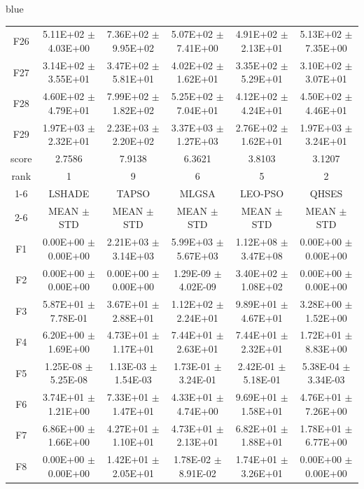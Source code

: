 \documentclass[journal, onecolumn]{IEEEtran}
\begin{document}
\begin{color}{blue}
\begin{table}[htbp!]
\begin{tabular}{c|ccccc}
		F26	 &	5.11E+02	$\pm$	4.03E+00	 &	7.36E+02	$\pm$	9.95E+02		 &	5.07E+02	$\pm$	7.41E+00		 &	4.91E+02	$\pm$	2.13E+01		 &	5.13E+02	$\pm$	7.35E+00	\\	
		F27	 &	3.14E+02	$\pm$	3.55E+01	 &	3.47E+02	$\pm$	5.81E+01		 &	4.02E+02	$\pm$	1.62E+01		 &	3.35E+02	$\pm$	5.29E+01		 &	3.10E+02	$\pm$	3.07E+01	\\	
		F28	 &	4.60E+02	$\pm$	4.79E+01	 &	7.99E+02	$\pm$	1.82E+02		 &	5.25E+02	$\pm$	7.04E+01		 &	4.12E+02	$\pm$	4.24E+01		 &	4.50E+02	$\pm$	4.46E+01	\\	
		F29	 &	1.97E+03	$\pm$	2.32E+01	 &	2.23E+03	$\pm$	2.20E+02		 &	3.37E+03	$\pm$	1.27E+03		 &	2.76E+02	$\pm$	1.62E+01		 &	1.97E+03	$\pm$	3.24E+01	\\	\hline
		score		& 2.7586 & 7.9138 & 6.3621 & 3.8103 & 3.1207											\\												
		rank	 	 & 1 & 9 & 6 & 5 & 2 											\\	\cline{1-6}											
		&	LSHADE				 &	TAPSO				 &	MLGSA				 &	LEO-PSO				 &	QHSES			\\\cline{2-6}	
		&	MEAN	$\pm$	STD		 &	MEAN	$\pm$	STD		 &	MEAN	$\pm$	STD		 &	MEAN	$\pm$	STD		 &	MEAN	$\pm$	STD	\\\hline
		F1	 &	0.00E+00	$\pm$	0.00E+00		 &	2.21E+03	$\pm$	3.14E+03		 &	5.99E+03	$\pm$	5.67E+03		 &	1.12E+08	$\pm$	3.47E+08		 &	0.00E+00	$\pm$	0.00E+00	\\
		F2	 &	0.00E+00	$\pm$	0.00E+00		 &	0.00E+00	$\pm$	0.00E+00		 &	1.29E-09	$\pm$	4.02E-09		 &	3.40E+02	$\pm$	1.08E+02		 &	0.00E+00	$\pm$	0.00E+00	\\
		F3	 &	5.87E+01	$\pm$	7.78E-01		 &	3.67E+01	$\pm$	2.88E+01		 &	1.12E+02	$\pm$	2.24E+01		 &	9.89E+01	$\pm$	4.67E+01		 &	3.28E+00	$\pm$	1.52E+00	\\
		F4	 &	6.20E+00	$\pm$	1.69E+00		 &	4.73E+01	$\pm$	1.17E+01		 &	7.44E+01	$\pm$	2.63E+01		 &	7.44E+01	$\pm$	2.32E+01		 &	1.72E+01	$\pm$	8.83E+00	\\
		F5	 &	1.25E-08	$\pm$	5.25E-08		 &	1.13E-03	$\pm$	1.54E-03		 &	1.73E-01	$\pm$	3.24E-01		 &	2.42E-01	$\pm$	5.18E-01		 &	5.38E-04	$\pm$	3.34E-03	\\
		F6	 &	3.74E+01	$\pm$	1.21E+00		 &	7.33E+01	$\pm$	1.47E+01		 &	4.33E+01	$\pm$	4.74E+00		 &	9.69E+01	$\pm$	1.58E+01		 &	4.76E+01	$\pm$	7.26E+00	\\
		F7	 &	6.86E+00	$\pm$	1.66E+00		 &	4.27E+01	$\pm$	1.10E+01		 &	4.73E+01	$\pm$	2.13E+01		 &	6.82E+01	$\pm$	1.88E+01		 &	1.78E+01	$\pm$	6.77E+00	\\
		F8	 &	0.00E+00	$\pm$	0.00E+00		 &	1.42E+01	$\pm$	2.05E+01		 &	1.78E-02	$\pm$	8.91E-02		 &	1.74E+01	$\pm$	3.26E+01		 &	0.00E+00	$\pm$	0.00E+00	\\

\end{tabular}
\end{table}
\end{color}
\end{document}
